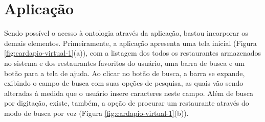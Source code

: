 \begin{figure}[H]
	\qquad
\end{figure}

\section{Aplicação}

Sendo possível o acesso à ontologia através da aplicação, bastou incorporar os demais elementos. Primeiramente, a aplicação apresenta uma tela inicial (Figura \ref{fig:cardapio-virtual-1}(a)), com a listagem dos todos os restaurantes armazenados no sistema e dos restaurantes favoritos do usuário, uma barra de busca e um botão para a tela de ajuda. Ao clicar no botão de busca, a barra se expande, exibindo o campo de busca com suas opções de pesquisa, as quais vão sendo alteradas à medida que o usuário insere caracteres neste campo. Além de busca por digitação, existe, também, a opção de procurar um restaurante através do modo de busca por voz (Figura \ref{fig:cardapio-virtual-1}(b)).

